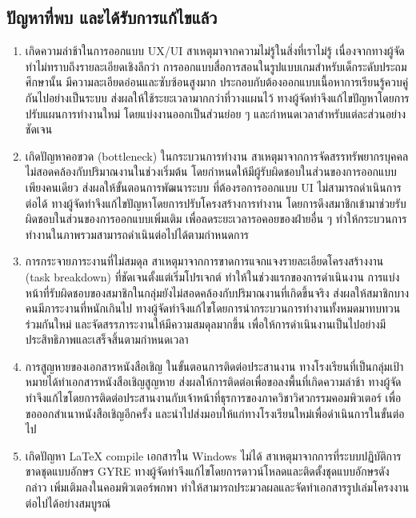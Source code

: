 \subsection*{ปัญหาที่พบ และได้รับการแก้ไขแล้ว}
\begin{enumerate}
    \item เกิดความล่าช้าในการออกแบบ UX/UI สาเหตุมาจากความไม่รู้ในสิ่งที่เราไม่รู้ เนื่องจากทางผู้จัดทำไม่ทราบถึงรายละเอียดเชิงลึกว่า การออกแบบสื่อการสอนในรูปแบบเกมสำหรับเด็กระดับประถมศึกษานั้น 
    มีความละเอียดอ่อนและซับซ้อนสูงมาก ประกอบกับต้องออกแบบเนื้อหาการเรียนรู้ควบคู่กันไปอย่างเป็นระบบ ส่งผลให้ใช้ระยะเวลามากกว่าที่วางแผนไว้ ทางผู้จัดทำจึงแก้ไขปัญหาโดยการปรับแผนการทำงานใหม่ 
    โดยแบ่งงานออกเป็นส่วนย่อย ๆ และกำหนดเวลาสำหรับแต่ละส่วนอย่างชัดเจน
    \item เกิดปัญหาคอขวด (bottleneck) ในกระบวนการทำงาน สาเหตุมาจากการจัดสรรทรัพยากรบุคคลไม่สอดคล้องกับปริมาณงานในช่วงเริ่มต้น โดยกำหนดให้มีผู้รับผิดชอบในส่วนของการออกแบบเพียงคนเดียว 
    ส่งผลให้ขั้นตอนการพัฒนาระบบ ที่ต้องรอการออกแบบ UI ไม่สามารถดำเนินการต่อได้ ทางผู้จัดทำจึงแก้ไขปัญหาโดยการปรับโครงสร้างการทำงาน โดยการดึงสมาชิกเข้ามาช่วยรับผิดชอบในส่วนของการออกแบบเพิ่มเติม 
    เพื่อลดระยะเวลารอคอยของฝ่ายอื่น ๆ ทำให้กระบวนการทำงานในภาพรวมสามารถดำเนินต่อไปได้ตามกำหนดการ
    \item การกระจายภาระงานที่ไม่สมดุล สาเหตุมาจากการขาดการแจกแจงรายละเอียดโครงสร้างงาน (task breakdown) ที่ชัดเจนตั้งแต่เริ่มโปรเจกต์ ทำให้ในช่วงแรกของการดำเนินงาน 
    การแบ่งหน้าที่รับผิดชอบของสมาชิกในกลุ่มยังไม่สอดคล้องกับปริมาณงานที่เกิดขึ้นจริง ส่งผลให้สมาชิกบางคนมีภาระงานที่หนักเกินไป ทางผู้จัดทำจึงแก้ไขโดยการนำกระบวนการทำงานทั้งหมดมาทบทวนร่วมกันใหม่ 
    และจัดสรรภาระงานให้มีความสมดุลมากขึ้น เพื่อให้การดำเนินงานเป็นไปอย่างมีประสิทธิภาพและเสร็จสิ้นตามกำหนดเวลา
    \item การสูญหายของเอกสารหนังสือเชิญ ในขั้นตอนการติดต่อประสานงาน ทางโรงเรียนที่เป็นกลุ่มเป้าหมายได้ทำเอกสารหนังสือเชิญสูญหาย 
    ส่งผลให้การติดต่อเพื่อขอลงพื้นที่เกิดความล่าช้า ทางผู้จัดทำจึงแก้ไขโดยการติดต่อประสานงานกับเจ้าหน้าที่ธุรการของภาควิชาวิศวกรรมคอมพิวเตอร์ 
    เพื่อขอออกสำเนาหนังสือเชิญอีกครั้ง และนำไปส่งมอบให้แก่ทางโรงเรียนใหม่เพื่อดำเนินการในขั้นต่อไป
    \item เกิดปัญหา LaTeX compile เอกสารใน Windows ไม่ได้ สาเหตุมาจากการที่ระบบปฏิบัติการขาดชุดแบบอักษร GYRE ทางผู้จัดทำจึงแก้ไขโดยการดาวน์โหลดและติดตั้งชุดแบบอักษรดังกล่าว
    เพิ่มเติมลงในคอมพิวเตอร์พกพา ทำให้สามารถประมวลผลและจัดทำเอกสารรูปเล่มโครงงานต่อไปได้อย่างสมบูรณ์
\end{enumerate}

